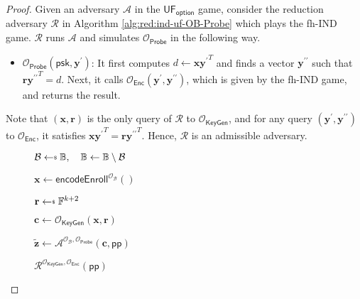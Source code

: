 \begin{proof}

Given an adversary $\mathcal{A}$ in the $\textsf{UF}_\textsf{option}$ game, consider the reduction adversary $\mathcal{R}$ in Algorithm \ref{alg:red:ind-uf-OB-Probe} which plays the \textsf{fh-IND} game. $\mathcal{R}$ runs $\mathcal{A}$ and simulates $\mathcal{O}_{\textsf{Probe}}$ in the following way.

\begin{itemize}

	\item $\mathcal{O}_{\textsf{Probe}}( \textsf{psk}, \mathbf{y}^\prime )$: It first computes $d \gets \mathbf{x}{\mathbf{y}^\prime}^T$ and finds a vector $\mathbf{y}^{\prime\prime}$ such that $\mathbf{r}{\mathbf{y}^{\prime\prime}}^T = d$. Next, it calls $\mathcal{O}_{\textsf{Enc}}(\mathbf{y}^\prime, {\mathbf{y}^{\prime\prime}})$, which is given by the \textsf{fh-IND} game, and returns the result.

\end{itemize}

\noindent Note that $(\mathbf{x}, \mathbf{r})$ is the only query of $\mathcal{R}$ to $\mathcal{O}_{\textsf{KeyGen}}$, and for any query $( \mathbf{y}^\prime, {\mathbf{y}^{\prime\prime}} )$ to $\mathcal{O}_{\textsf{Enc}}$, it satisfies $\mathbf{x}{\mathbf{y}^\prime}^T = \mathbf{r}{\mathbf{y}^{\prime\prime}}^T$. Hence, $\mathcal{R}$ is an admissible adversary.

\begin{figure}[h]
\centering
	
	\begin{minipage}[t]{0.6\linewidth}
	\centering
	\begin{algorithm}[H]
	\caption{$\mathcal{R}^{\mathcal{O}_{\textsf{KeyGen}}, \mathcal{O}_{\textsf{Enc}}}(\textsf{pp})$}
	\label{alg:red:ind-uf-OB-Probe}
	\begin{algorithmic}[1]
		\State $\mathcal{B} \getsdollar \mathbb{B}, \quad \mathbb{B} \gets \mathbb{B} \setminus \mathcal{B}$ \label{alg:red:ind-uf-OB-Probe:B}

		\State $\mathbf{x} \gets \textsf{encodeEnroll}^{\mathcal{O}_{\mathcal{B}}}()$

		\State $\mathbf{r} \getsdollar \mathbb{F}^{k+2}$

		\State $\mathbf{c} \gets \mathcal{O}_{\textsf{KeyGen}}(\mathbf{x}, \mathbf{r})$

		\State ${\mathbf{\tilde{z}}} \gets \mathcal{A}^{\mathcal{O}_{\mathcal{B}}, \mathcal{O}_{\textsf{Probe}} } ( \mathbf{c}, \textsf{pp})$


\end{algorithmic}
\end{algorithm}
\end{minipage}
\end{figure}
\end{proof}
